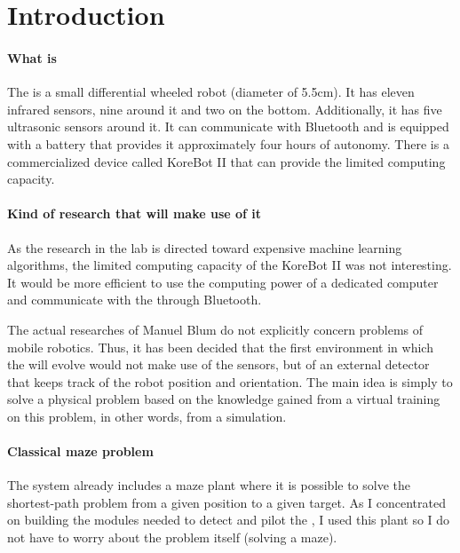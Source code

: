 \chapter{Introduction}

\subsubsection{What is \khepera{}}
The \khepera{} is a small differential wheeled robot (diameter of 5.5cm). 
It has eleven infrared sensors, nine around it and two on the bottom. 
Additionally, it has five ultrasonic sensors around it. It can communicate 
with Bluetooth and is equipped with a battery that provides it 
approximately four hours of autonomy. There is a commercialized device 
called KoreBot II that can provide the \khepera{} limited computing 
capacity. 

\subsubsection{Kind of research that will make use of it}
As the research in the lab is directed toward expensive machine learning 
algorithms, the limited computing capacity of the KoreBot II was not 
interesting. It would be more efficient to use the computing power of 
a dedicated computer and communicate with the \khepera{} through 
Bluetooth.

The actual researches of Manuel Blum do not explicitly concern problems 
of mobile robotics. Thus, it has been decided that the first environment 
in which the \khepera{} will evolve would not make use of the sensors, 
but of an external detector that keeps track of the robot position and 
orientation. The main idea is simply to solve a physical problem based 
on the knowledge gained from a virtual training on this problem, in 
other words, from a simulation.

\subsubsection{Classical maze problem}
The \clsquare{} system already includes a maze plant where it is possible 
to solve the shortest-path problem from a given position to a given 
target. As I concentrated on building the modules needed to detect and 
pilot the \khepera{}, I used this plant so I do not have to worry 
about the problem itself (solving a maze).

